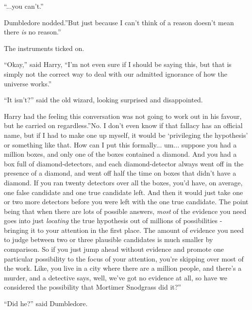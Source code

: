 ``...you can't.''

Dumbledore nodded.''But just because I can't think of a reason doesn't
mean there \emph{is} no reason.''

The instruments ticked on.

``Okay,'' said Harry, ``I'm not even sure if I should be saying this,
but that is simply not the correct way to deal with our admitted
ignorance of how the universe works.''

``It isn't?'' said the old wizard, looking surprised and disappointed.

Harry had the feeling this conversation was not going to work out in his
favour, but he carried on regardless.''No. I don't even know if that
fallacy has an official name, but if I had to make one up myself, it
would be `privileging the hypothesis' or something like that. How can I
put this formally... um... suppose you had a million boxes,
and only one of the boxes contained a diamond. And you had a box full of
diamond-detectors, and each diamond-detector always went off in the
presence of a diamond, and went off half the time on boxes that didn't
have a diamond. If you ran twenty detectors over all the boxes, you'd
have, on average, one false candidate and one true candidate left. And
then it would just take one or two more detectors before you were left
with the one true candidate. The point being that when there are lots of
possible answers, \emph{most} of the evidence you need goes into just
\emph{locating} the true hypothesis out of millions of possibilities -
bringing it to your attention in the first place. The amount of evidence
you need to judge between two or three plausible candidates is much
smaller by comparison. So if you just jump ahead without evidence and
promote one particular possibility to the focus of your attention,
you're skipping over most of the work. Like, you live in a city where
there are a million people, and there's a murder, and a detective says,
well, we've got no evidence at all, so have we considered the
possibility that Mortimer Snodgrass did it?''

``Did he?'' said Dumbledore.

